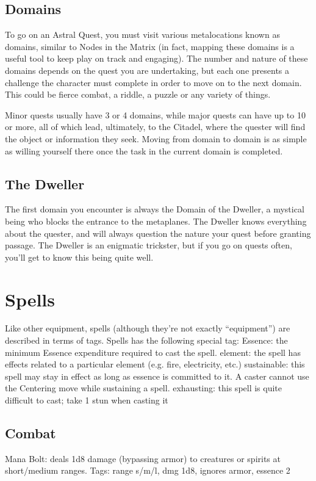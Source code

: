 \subsection{Domains}
To go on an Astral Quest, you must visit various metalocations known as domains, similar to Nodes in the Matrix (in fact, mapping these domains is a useful tool to keep play on track and engaging). The number and nature of these domains depends on the quest you are undertaking, but each one presents a challenge the character must complete in order to move on to the next domain. This could be fierce combat, a riddle, a puzzle or any variety of things.

Minor quests usually have 3 or 4 domains, while major quests can have up to 10 or more, all of which lead, ultimately, to the Citadel, where the quester will find the object or information they seek. Moving from domain to domain is as simple as willing yourself there once the task in the current domain is completed.


\subsection{The Dweller}
The first domain you encounter is always the Domain of the Dweller, a mystical being who blocks the entrance to the metaplanes. The Dweller knows everything about the quester, and will always question the nature your quest before granting passage. The Dweller is an enigmatic trickster, but if you go on quests often, you’ll get to know this being quite well.






\section{Spells}

Like other equipment, spells (although they’re not exactly “equipment”) are described in terms of tags. Spells has the following special tag:
Essence: the minimum Essence expenditure required to cast the spell.
element: the spell has effects related to a particular element (e.g. fire, electricity, etc.)
sustainable: this spell may stay in effect as long as essence is committed to it. A caster cannot use the Centering move while sustaining a spell.
exhausting: this spell is quite difficult to cast; take 1 stun when casting it


\subsection{Combat}
Mana Bolt: deals 1d8 damage (bypassing armor) to creatures or spirits at short/medium ranges. Tags: range s/m/l, dmg 1d8, ignores armor, essence 2


